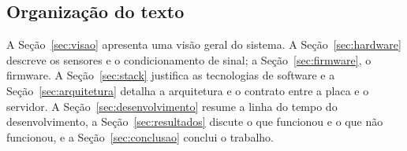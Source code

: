 \subsection{Organização do texto}

A Seção~\ref{sec:visao} apresenta uma visão geral do sistema. A Seção~\ref{sec:hardware} descreve os sensores e o condicionamento de sinal; a Seção~\ref{sec:firmware}, o firmware. A Seção~\ref{sec:stack} justifica as tecnologias de software e a Seção~\ref{sec:arquitetura} detalha a arquitetura e o contrato entre a placa e o servidor. A Seção~\ref{sec:desenvolvimento} resume a linha do tempo do desenvolvimento, a Seção~\ref{sec:resultados} discute o que funcionou e o que não funcionou, e a Seção~\ref{sec:conclusao} conclui o trabalho.
